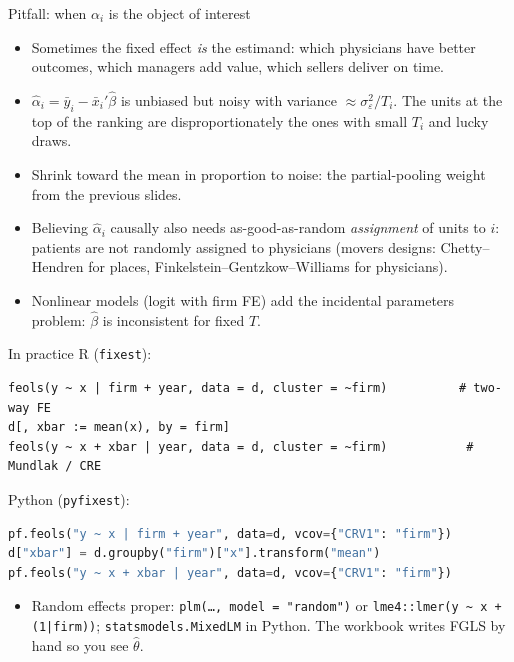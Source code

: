 \documentclass[aspectratio=169,11pt]{beamer}
\begin{document}
\begin{frame}{Pitfall: when $\alpha_i$ is the object of interest}
\begin{itemize}
	\item Sometimes the fixed effect \emph{is} the estimand: which physicians have better outcomes,
	which managers add value, which sellers deliver on time.
	\medskip
	\item $\hat\alpha_i = \bar y_i - \bar x_i'\hat\beta$ is unbiased but noisy with variance
	$\approx \sigma^2_\varepsilon / T_i$. The units at the top of the ranking are disproportionately
	the ones with small $T_i$ and lucky draws.
	\medskip
	\item Shrink toward the mean in proportion to noise: the partial-pooling weight from the previous slides.
	\item Believing $\hat\alpha_i$ causally also needs as-good-as-random \emph{assignment}
	of units to $i$: patients are not randomly assigned to physicians (movers designs: Chetty--Hendren for
	places, Finkelstein--Gentzkow--Williams for physicians).
	\item Nonlinear models (logit with firm FE) add the \alert{incidental parameters} problem:
	$\hat\beta$ is inconsistent for fixed $T$.
\end{itemize}
\end{frame}


\begin{frame}[fragile]{In practice}
R (\texttt{fixest}):
\begin{lstlisting}
feols(y ~ x | firm + year, data = d, cluster = ~firm)          # two-way FE
d[, xbar := mean(x), by = firm]
feols(y ~ x + xbar | year, data = d, cluster = ~firm)           # Mundlak / CRE
\end{lstlisting}
Python (\texttt{pyfixest}):
\begin{lstlisting}[language=Python]
pf.feols("y ~ x | firm + year", data=d, vcov={"CRV1": "firm"})
d["xbar"] = d.groupby("firm")["x"].transform("mean")
pf.feols("y ~ x + xbar | year", data=d, vcov={"CRV1": "firm"})
\end{lstlisting}
\begin{itemize}
	\item Random effects proper: \texttt{plm(\dots, model = "random")} or \texttt{lme4::lmer(y \textasciitilde{} x + (1|firm))};
	\texttt{statsmodels.MixedLM} in Python. The workbook writes FGLS by hand so you see $\hat\theta$.
\end{itemize}
\end{frame}
\end{document}
